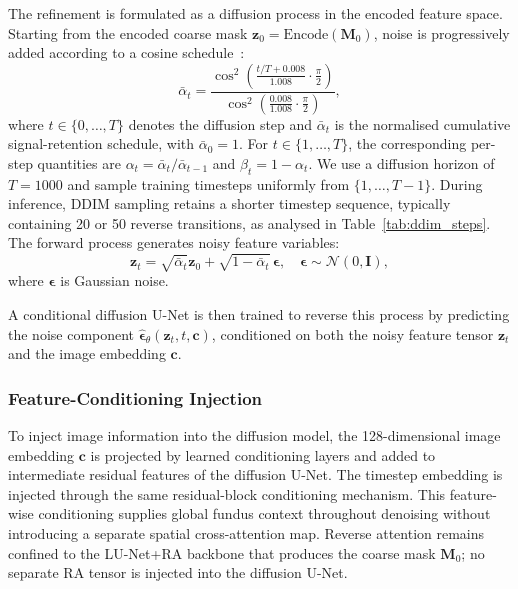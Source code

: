 \documentclass[jimaging,article,submit,pdftex,moreauthors]
  {Definitions/mdpi}
\begin{document}
The refinement is formulated as a diffusion process in the encoded feature space. Starting from the encoded coarse mask $\mathbf{z}_0=\mathrm{Encode}(\mathbf{M}_0)$, noise is progressively added according to a cosine schedule~\cite{Nichol2021}:
\begin{equation}
\bar{\alpha}_t=\frac{\cos^2\!\left(\frac{t/T+0.008}{1.008}\cdot\frac{\pi}{2}\right)}{\cos^2\!\left(\frac{0.008}{1.008}\cdot\frac{\pi}{2}\right)},
\end{equation}
where $t\in\{0,\dots,T\}$ denotes the diffusion step and $\bar{\alpha}_t$ is the normalised cumulative signal-retention schedule, with $\bar{\alpha}_0=1$. For $t\in\{1,\dots,T\}$, the corresponding per-step quantities are $\alpha_t=\bar{\alpha}_t/\bar{\alpha}_{t-1}$ and $\beta_t=1-\alpha_t$. We use a diffusion horizon of $T=1000$ and sample training timesteps uniformly from $\{1,\dots,T-1\}$. During inference, DDIM sampling retains a shorter timestep sequence, typically containing 20 or 50 reverse transitions, as analysed in Table~\ref{tab:ddim_steps}. The forward process generates noisy feature variables:
\begin{equation}
\mathbf{z}_t=\sqrt{\bar{\alpha}_t}\mathbf{z}_0+\sqrt{1-\bar{\alpha}_t}\,\boldsymbol{\epsilon}, 
\quad \boldsymbol{\epsilon}\sim\mathcal{N}(0,\mathbf{I}),
\end{equation}
where $\boldsymbol{\epsilon}$ is Gaussian noise.

A conditional diffusion U-Net is then trained to reverse this process by predicting the noise component $\hat{\boldsymbol{\epsilon}}_\theta(\mathbf{z}_t,t,\mathbf{c})$, conditioned on both the noisy feature tensor $\mathbf{z}_t$ and the image embedding $\mathbf{c}$.


\subsubsection{Feature-Conditioning Injection}

To inject image information into the diffusion model, the 128-dimensional image embedding $\mathbf{c}$ is projected by learned conditioning layers and added to intermediate residual features of the diffusion U-Net. The timestep embedding is injected through the same residual-block conditioning mechanism. This feature-wise conditioning supplies global fundus context throughout denoising without introducing a separate spatial cross-attention map. Reverse attention remains confined to the LU-Net+RA backbone that produces the coarse mask $\mathbf{M}_0$; no separate RA tensor is injected into the diffusion U-Net.
\end{document}
